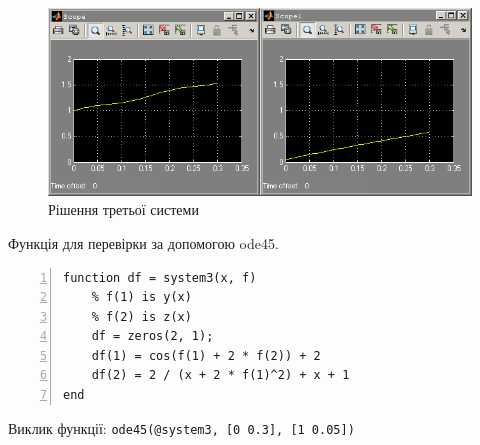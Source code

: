 \documentclass[a4paper, 10pt]{article}
\begin{document}
\begin{enumerate}
{\begin{enumerate}
{		\begin{figure}[H]
		\begin{center}
		\includegraphics{lab2_3_sol.png}
		\caption{Рішення третьої системи}
		\end{center}
		\end{figure}

		\noindent
		Функція для перевірки за допомогою ode45.
		\begin{lstlisting}[numbers=left]
function df = system3(x, f)
    % f(1) is y(x)
    % f(2) is z(x)
    df = zeros(2, 1);
    df(1) = cos(f(1) + 2 * f(2)) + 2
    df(2) = 2 / (x + 2 * f(1)^2) + x + 1
end
		\end{lstlisting}

		Виклик функції: \texttt{ode45(@system3, [0 0.3], [1 0.05])}

}
\end{enumerate}}
\end{enumerate}
\end{document}
